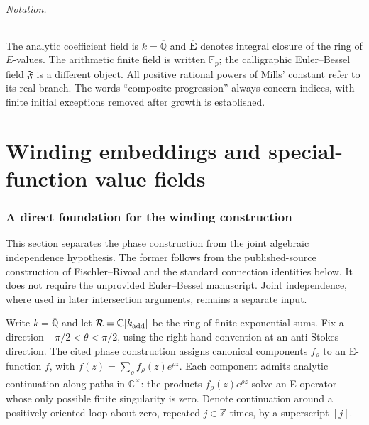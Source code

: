 \documentclass[11pt,a4paper]{article}
\theoremstyle{definition}\newtheorem{definition}[theorem]{Definition}
\theoremstyle{remark}\newtheorem{remark}[theorem]{Remark}
\begin{document}
\paragraph{Notation.}
The analytic coefficient field is $k=\overline{\mathbb Q}$ and
$\overline{\mathbf E}$ denotes integral closure of the ring of $E$-values.
The arithmetic finite field is written $\mathbb F_p$; the calligraphic
Euler--Bessel field $\mathfrak F$ is a different object.
All positive rational powers of Mills' constant refer to its real branch.
The words ``composite progression'' always concern indices, with finite
initial exceptions removed after growth is established.
\clearpage
\part{Winding embeddings and special-function value fields}
\section{A direct foundation for the winding construction}
\label{foundation:section}
This section separates the phase construction from the joint algebraic
independence hypothesis.  The former follows from the published-source
construction of Fischler--Rivoal \cite[Theorem 2.3 and Proposition 3.1]{FR}
and the standard connection identities below.  It does not require the
unprovided Euler--Bessel manuscript.  Joint independence, where used in
later intersection arguments, remains a separate input.

Write $k=\overline{\mathbb Q}$ and let
$\mathcal R=\mathbb C[k_{\rm add}]$ be the ring of finite exponential sums.
Fix a direction $-\pi/2<\theta<\pi/2$, using the right-hand convention at
an anti-Stokes direction.  The cited phase construction assigns canonical
components $f_\rho$ to an E-function $f$, with
$f(z)=\sum_\rho f_\rho(z)e^{\rho z}$.  Each component admits analytic
continuation along paths in $\mathbb C^\times$: the products
$f_\rho(z)e^{\rho z}$ solve an E-operator whose only possible finite
singularity is zero.  Denote continuation around a positively oriented
loop about zero, repeated $j\in\mathbb Z$ times, by a superscript $[j]$.
\end{document}
